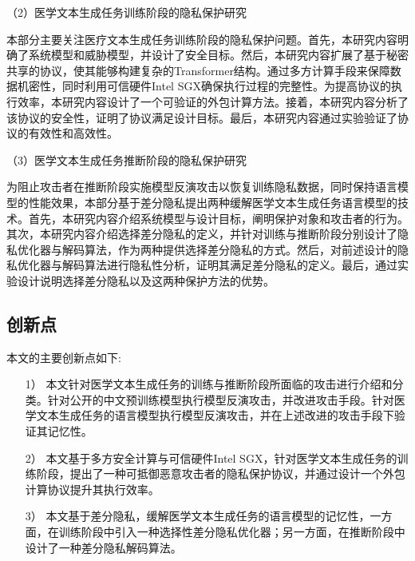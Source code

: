 （2）医学文本生成任务训练阶段的隐私保护研究


本部分主要关注医疗文本生成任务训练阶段的隐私保护问题。首先，本研究内容明确了系统模型和威胁模型，并设计了安全目标。然后，本研究内容扩展了基于秘密共享的协议，使其能够构建复杂的Transformer结构。通过多方计算手段来保障数据机密性，同时利用可信硬件Intel SGX确保执行过程的完整性。为提高协议的执行效率，本研究内容设计了一个可验证的外包计算方法。接着，本研究内容分析了该协议的安全性，证明了协议满足设计目标。最后，本研究内容通过实验验证了协议的有效性和高效性。

（3）医学文本生成任务推断阶段的隐私保护研究


为阻止攻击者在推断阶段实施模型反演攻击以恢复训练隐私数据，同时保持语言模型的性能效果，本部分基于差分隐私提出两种缓解医学文本生成任务语言模型的技术。首先，本研究内容介绍系统模型与设计目标，阐明保护对象和攻击者的行为。其次，本研究内容介绍选择差分隐私的定义，并针对训练与推断阶段分别设计了隐私优化器与解码算法，作为两种提供选择差分隐私的方式。然后，对前述设计的隐私优化器与解码算法进行隐私性分析，证明其满足差分隐私的定义。最后，通过实验设计说明选择差分隐私以及这两种保护方法的优势。

\subsection{创新点}

本文的主要创新点如下:

%
%

\begin{itemize}
	\item [1）]
	本文针对医学文本生成任务的训练与推断阶段所面临的攻击进行介绍和分类。针对公开的中文预训练模型执行模型反演攻击，并改进攻击手段。针对医学文本生成任务的语言模型执行模型反演攻击，并在上述改进的攻击手段下验证其记忆性。
	\item [2）]
	本文基于多方安全计算与可信硬件Intel SGX，针对医学文本生成任务的训练阶段，提出了一种可抵御恶意攻击者的隐私保护协议，并通过设计一个外包计算协议提升其执行效率。
	\item [3）]
	本文基于差分隐私，缓解医学文本生成任务的语言模型的记忆性，一方面，在训练阶段中引入一种选择性差分隐私优化器；另一方面，在推断阶段中设计了一种差分隐私解码算法。
	
\end{itemize}


